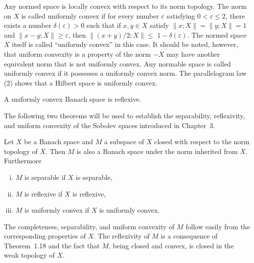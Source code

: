 \begin{para}
  Any normed space is locally convex with respect to its norm topology.
  The norm on $X$ is called uniformly convex if for every number $\varepsilon$ 
  satisfying $0<\varepsilon \leq 2$, there exists a number $\delta(\varepsilon)>0$ such 
  that if $x, y \in X$ satisfy $\|x ; X\|=\|y ; X\|=1$ and $\|x-y ; X\| \geq \varepsilon$, then $\|(x+y) / 2 ; X\| \leq$ $1-\delta(\varepsilon)$.
  The normed space $X$ itself is called ``uniformly convex'' in this case.
  It should be noted, however, that uniform convexity is a property of the norm $-X$ 
  may have another equivalent norm that is not uniformly convex. Any normable space 
  is called uniformly convex if it possesses a uniformly convex norm.
  The parallelogram law (2) shows that a Hilbert space is uniformly convex.
\end{para}

\begin{theorem}
  A uniformly convex Banach space is reflexive.
\end{theorem}

The following two theorems will be used to establish the separability, reflexivity, and uniform convexity of the Sobolev spaces introduced in Chapter~3.


\begin{theorem}
  Let $X$ be a Banach space and $M$ a subspace of $X$ closed with respect to the norm 
  topology of $X$. Then $M$ is also a Banach space under the norm inherited from $X$. 
  Furthermore
  \begin{enumerate}[(i)]
    \item $M$ is separable if $X$ is separable,
    \item $M$ is reflexive if $X$ is reflexive,
    \item $M$ is uniformly convex if $X$ is uniformly convex.
  \end{enumerate}
\end{theorem}

The completeness, separability, and uniform convexity of $M$ follow easily from the corresponding properties of $X$. The reflexivity of $M$ is a consequence of Theorem~1.18 and the fact that $M$, being closed and convex, is closed in the weak topology of $X$.

